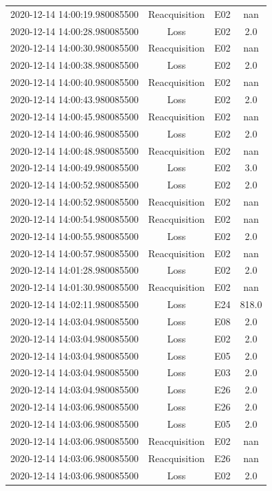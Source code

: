 \begin{enumerate}
\begin{longtabu}{cccc}
2020{-}12{-}14 14:00:19.980085500&Reacquisition&E02&nan\\%
2020{-}12{-}14 14:00:28.980085500&Loss&E02&2.0\\%
2020{-}12{-}14 14:00:30.980085500&Reacquisition&E02&nan\\%
2020{-}12{-}14 14:00:38.980085500&Loss&E02&2.0\\%
2020{-}12{-}14 14:00:40.980085500&Reacquisition&E02&nan\\%
2020{-}12{-}14 14:00:43.980085500&Loss&E02&2.0\\%
2020{-}12{-}14 14:00:45.980085500&Reacquisition&E02&nan\\%
2020{-}12{-}14 14:00:46.980085500&Loss&E02&2.0\\%
2020{-}12{-}14 14:00:48.980085500&Reacquisition&E02&nan\\%
2020{-}12{-}14 14:00:49.980085500&Loss&E02&3.0\\%
2020{-}12{-}14 14:00:52.980085500&Loss&E02&2.0\\%
2020{-}12{-}14 14:00:52.980085500&Reacquisition&E02&nan\\%
2020{-}12{-}14 14:00:54.980085500&Reacquisition&E02&nan\\%
2020{-}12{-}14 14:00:55.980085500&Loss&E02&2.0\\%
2020{-}12{-}14 14:00:57.980085500&Reacquisition&E02&nan\\%
2020{-}12{-}14 14:01:28.980085500&Loss&E02&2.0\\%
2020{-}12{-}14 14:01:30.980085500&Reacquisition&E02&nan\\%
2020{-}12{-}14 14:02:11.980085500&Loss&E24&818.0\\%
2020{-}12{-}14 14:03:04.980085500&Loss&E08&2.0\\%
2020{-}12{-}14 14:03:04.980085500&Loss&E02&2.0\\%
2020{-}12{-}14 14:03:04.980085500&Loss&E05&2.0\\%
2020{-}12{-}14 14:03:04.980085500&Loss&E03&2.0\\%
2020{-}12{-}14 14:03:04.980085500&Loss&E26&2.0\\%
2020{-}12{-}14 14:03:06.980085500&Loss&E26&2.0\\%
2020{-}12{-}14 14:03:06.980085500&Loss&E05&2.0\\%
2020{-}12{-}14 14:03:06.980085500&Reacquisition&E02&nan\\%
2020{-}12{-}14 14:03:06.980085500&Reacquisition&E26&nan\\%
2020{-}12{-}14 14:03:06.980085500&Loss&E02&2.0\\%

\end{longtabu}
\end{enumerate}
